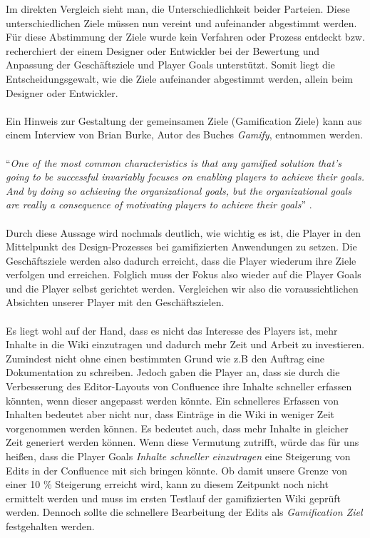 \documentclass[a4paper,12pt,twoside]{scrartcl}
\begin{document}
Im direkten Vergleich sieht man, die Unterschiedlichkeit beider Parteien. Diese unterschiedlichen Ziele müssen nun vereint und aufeinander abgestimmt werden. Für diese Abstimmung der Ziele wurde kein Verfahren oder Prozess entdeckt bzw. recherchiert der einem Designer oder Entwickler bei der Bewertung und Anpassung der Geschäftsziele und Player Goals unterstützt. Somit liegt die Entscheidungsgewalt, wie die Ziele aufeinander abgestimmt werden, allein beim Designer oder Entwickler.
\\\\
Ein Hinweis zur Gestaltung der gemeinsamen Ziele (Gamification Ziele) kann aus einem Interview von Brian Burke, Autor des Buches \textit{Gamify}, entnommen werden.
\\\\
\enquote{\textit{One of the most common characteristics is that any gamified solution that's going to be successful invariably focuses on enabling players to achieve their goals. And by doing so achieving the organizational goals, but the organizational goals are really a consequence of motivating players to achieve their goals}} \cite{Kapko14}.
\\\\
Durch diese Aussage wird nochmals deutlich, wie wichtig es ist, die Player in den Mittelpunkt des Design-Prozesses bei gamifizierten Anwendungen zu setzen. Die Geschäftsziele werden also dadurch erreicht, dass die Player wiederum ihre Ziele verfolgen und erreichen. Folglich muss der Fokus also wieder auf die Player Goals und die Player selbst gerichtet werden. Vergleichen wir also die voraussichtlichen Absichten unserer Player mit den Geschäftszielen.        
\\\\
Es liegt wohl auf der Hand, dass es nicht das Interesse des Players ist, mehr Inhalte in die Wiki einzutragen und dadurch mehr Zeit und Arbeit zu investieren. Zumindest nicht ohne einen bestimmten Grund wie z.B den Auftrag eine Dokumentation zu schreiben. Jedoch gaben die Player an, dass sie durch die Verbesserung des Editor-Layouts von Confluence ihre Inhalte schneller erfassen könnten, wenn dieser angepasst werden könnte. Ein schnelleres Erfassen von Inhalten bedeutet aber nicht nur, dass Einträge in die Wiki in weniger Zeit vorgenommen werden können. Es bedeutet auch, dass mehr Inhalte in gleicher Zeit generiert werden können. Wenn diese Vermutung zutrifft, würde das für uns heißen, dass die Player Goals \textit{Inhalte schneller einzutragen} eine Steigerung von Edits in der Confluence mit sich bringen könnte. Ob damit unsere Grenze von einer 10 \% Steigerung erreicht wird, kann zu diesem Zeitpunkt noch nicht ermittelt werden und muss im ersten Testlauf der gamifizierten Wiki geprüft werden. Dennoch sollte die schnellere Bearbeitung der Edits als \textit{Gamification Ziel} festgehalten werden.
\end{document}
